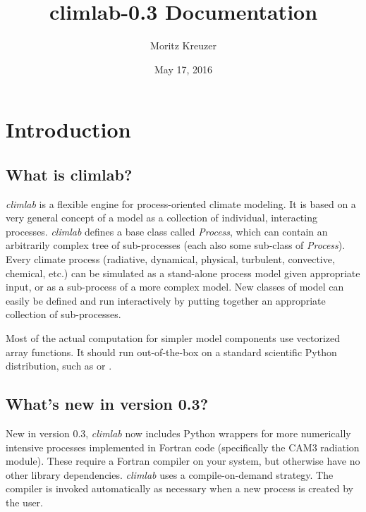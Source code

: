 \documentclass[a4paper,10pt,english]{sphinxmanual}
\title{climlab-0.3 Documentation}
\date{May 17, 2016}
\author{Moritz Kreuzer}
\begin{document}
\maketitle
\tableofcontents
{}\label{index::doc}



\chapter{Introduction}
\label{intro:introduction}\label{intro::doc}\label{intro:welcome-to-the-climlab-documentation}\label{intro:id1}

\section{What is climlab?}
\label{intro:what-is-climlab}
\emph{climlab} is a flexible engine for process-oriented climate modeling.
It is based on a very general concept of a model as a collection of individual,
interacting processes. \emph{climlab} defines a base class called \emph{Process}, which
can contain an arbitrarily complex tree of sub-processes (each also some
sub-class of \emph{Process}). Every climate process (radiative, dynamical,
physical, turbulent, convective, chemical, etc.) can be simulated as a stand-alone
process model given appropriate input, or as a sub-process of a more complex model.
New classes of model can easily be defined and run interactively by putting together an
appropriate collection of sub-processes.

Most of the actual computation for simpler model components use vectorized
 array functions. It should run out-of-the-box on a standard scientific
Python distribution, such as  or .


\section{What's new in version 0.3?}
\label{intro:what-s-new-in-version-0-3}
New in version 0.3, \emph{climlab} now includes Python wrappers for more
numerically intensive processes implemented in Fortran code (specifically the
CAM3 radiation module). These require a Fortran compiler on your system,
but otherwise have no other library dependencies.  \emph{climlab} uses a compile-on-demand
strategy. The compiler is invoked automatically as necessary when a new process
is created by the user.
\end{document}
